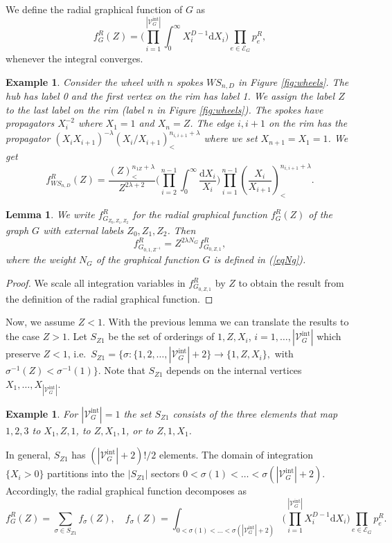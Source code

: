 \documentclass[oneside]{amsart}
\newcommand{\dd}{\mathrm{d}}
\newcommand{\sE}{\mathcal{E}}
\newcommand{\sV}{\mathcal{V}}
\newcommand{\sVGint}{{\sV_G^\mathrm{int}}}
\newcommand{\VGint}{{|\sVGint|}}
\theoremstyle{plain}
\newtheorem{lem}[thm]{Lemma}
\newtheorem{ex}[thm]{Example}
\begin{document}
We define the radial graphical function of $G$ as
\begin{equation}\label{fGRdef}
f_G^R(Z)=\Big(\prod_{i=1}^\VGint\int_0^\infty X_i^{D-1}\dd X_i\Big)\prod_{e\in\sE_G}p^R_e,
\end{equation}
whenever the integral converges.

\begin{ex}\label{exWSnR}
Consider the wheel with $n$ spokes $W\!S_{n,D}$ in Figure \ref{fig:wheels}. The hub has label 0 and the first vertex on the rim has label 1.
We assign the label $Z$ to the last label on the rim (label $n$ in Figure \ref{fig:wheels}). The spokes have propagators $X_i^{-2}$ where $X_1=1$ and $X_n=Z$.
The edge $i,i+1$ on the rim has the propagator $(X_iX_{i+1})^{-\lambda}(X_i/X_{i+1})^{n_{i,i+1}+\lambda}_<$ where we set $X_{n+1}=X_1=1$. We get
\begin{equation}\label{WSR}
f_{W\!S_{n,D}}^R(Z)=\frac{(Z)^{n_{1Z}+\lambda}_<}{Z^{2\lambda+2}}\Big(\prod_{i=2}^{n-1}\int_0^\infty\frac{\dd X_i}{X_i}\Big)\prod_{i=1}^{n-1}\genfrac(){}{}{X_i}{X_{i+1}}^{n_{i,i+1}+\lambda}_<.
\end{equation}
\end{ex}

\begin{lem}
We write $f_{G_{Z_0,Z_1,Z_2}}^R$ for the radial graphical function $f_G^R(Z)$ of the graph $G$ with external labels $Z_0,Z_1,Z_2$. Then
\begin{equation}\label{Zrez}
f_{G_{0,1,Z^{-1}}}^R=Z^{2\lambda N_G}f_{G_{0,Z,1}}^R,
\end{equation}
where the weight $N_G$ of the graphical function $G$ is defined in (\ref{eqNg}).
\end{lem}
\begin{proof}
We scale all integration variables in $f_{G_{0,Z,1}}^R$ by $Z$ to obtain the result from the definition of the radial graphical function.
\end{proof}

Now, we assume $Z<1$. With the previous lemma we can translate the results to the case $Z>1$.
Let $S_{Z1}$ be the set of orderings of $1,Z,X_i$, $i=1,\ldots,\VGint$ which preserve $Z<1$,
i.e.\ $S_{Z1}=\{\sigma:\{1,2,\ldots,\VGint+2\}\to\{1,Z,X_i\},$ with $\sigma^{-1}(Z)<\sigma^{-1}(1)\}$.
Note that $S_{Z1}$ depends on the internal vertices $X_1,\ldots,X_\VGint$.
\begin{ex}
For $\VGint=1$ the set $S_{Z1}$ consists of the three elements that map $1,2,3$ to $X_1,Z,1$, to $Z,X_1,1$, or to $Z,1,X_1$.
\end{ex}
In general, $S_{Z1}$ has $(\VGint+2)!/2$ elements.
The domain of integration $\{X_i>0\}$ partitions into the $|S_{Z1}|$ sectors $0<\sigma(1)<\ldots<\sigma(\VGint+2)$. Accordingly, the radial graphical function decomposes as
$$
f_G^R(Z)=\sum_{\sigma\in S_{Z1}}f_\sigma(Z),\quad f_\sigma(Z)=\int_{0<\sigma(1)<\ldots<\sigma(\VGint+2)}\Big(\prod_{i=1}^\VGint X_i^{D-1}\dd X_i\Big)\prod_{e\in\sE_G}p^R_e.
$$
\end{document}
